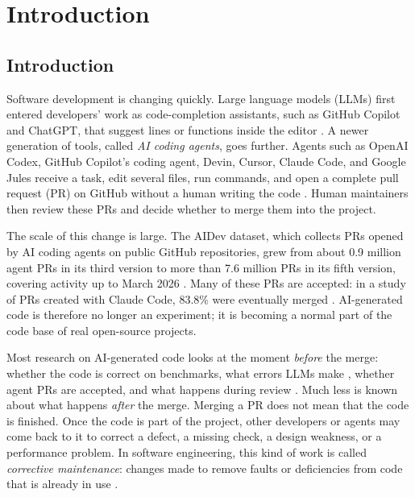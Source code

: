 \chapter{Introduction}
\label{ch:introduction}

\section{Introduction}
\label{sec:introduction}

Software development is changing quickly. Large language models (LLMs) first
entered developers' work as code-completion assistants, such as GitHub Copilot
and ChatGPT, that suggest lines or functions inside the editor
\cite{yu2024where}. A newer generation of tools, called \emph{AI coding agents},
goes further. Agents such as OpenAI Codex, GitHub Copilot's coding agent, Devin,
Cursor, Claude Code, and Google Jules receive a task, edit several files, run
commands, and open a complete pull request (PR) on GitHub without a human writing
the code \cite{li2026aidev,watanabe2025agentic}. Human maintainers then review
these PRs and decide whether to merge them into the project.

The scale of this change is large. The AIDev dataset, which collects PRs opened
by AI coding agents on public GitHub repositories, grew from about 0.9 million
agent PRs in its third version to more than 7.6 million PRs in its fifth version,
covering activity up to March 2026 \cite{li2026aidev,aidev2026hf}. Many of these
PRs are accepted: in a study of PRs created with Claude Code, 83.8\% were
eventually merged \cite{watanabe2025agentic}. AI-generated code is therefore no
longer an experiment; it is becoming a normal part of the code base of real
open-source projects.

Most research on AI-generated code looks at the moment \emph{before} the merge:
whether the code is correct on benchmarks, what errors LLMs make
\cite{wang2025towards}, whether agent PRs are accepted, and what happens during
review \cite{watanabe2025agentic}. Much less is known about what happens
\emph{after} the merge. Merging a PR does not mean that the code is finished.
Once the code is part of the project, other developers or agents may come back to
it to correct a defect, a missing check, a design weakness, or a performance
problem. In software engineering, this kind of work is called \emph{corrective
maintenance}: changes made to remove faults or deficiencies from code that is
already in use \cite{swanson1976dimensions}.


